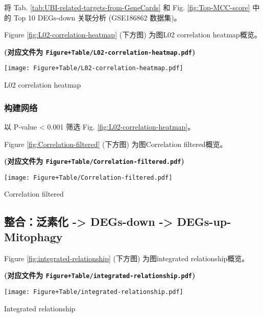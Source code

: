 \documentclass[
]{article}
\begin{document}
将 Tab. \ref{tab:UBI-related-targets-from-GeneCards} 和 Fig. \ref{fig:Top-MCC-score} 中的 Top 10 DEGs-down
关联分析 (GSE186862 数据集)。

Figure \ref{fig:L02-correlation-heatmap} (下方图) 为图L02 correlation heatmap概览。

\textbf{(对应文件为 \texttt{Figure+Table/L02-correlation-heatmap.pdf})}

\def\@captype{figure}
\begin{center}
\texttt{[image: Figure+Table/L02-correlation-heatmap.pdf]}
\caption{L02 correlation heatmap}\label{fig:L02-correlation-heatmap}
\end{center}

\hypertarget{ux6784ux5efaux7f51ux7edc}{%
\subsubsection{构建网络}\label{ux6784ux5efaux7f51ux7edc}}

以 P-value \textless{} 0.001 筛选 Fig. \ref{fig:L02-correlation-heatmap}。

Figure \ref{fig:Correlation-filtered} (下方图) 为图Correlation filtered概览。

\textbf{(对应文件为 \texttt{Figure+Table/Correlation-filtered.pdf})}

\def\@captype{figure}
\begin{center}
\texttt{[image: Figure+Table/Correlation-filtered.pdf]}
\caption{Correlation filtered}\label{fig:Correlation-filtered}
\end{center}

\hypertarget{ux6574ux5408ux6cdbux7d20ux5316---degs-down---degs-up-mitophagy}{%
\subsection{整合：泛素化 -\textgreater{} DEGs-down -\textgreater{} DEGs-up-Mitophagy}\label{ux6574ux5408ux6cdbux7d20ux5316---degs-down---degs-up-mitophagy}}

Figure \ref{fig:integrated-relationship} (下方图) 为图integrated relationship概览。

\textbf{(对应文件为 \texttt{Figure+Table/integrated-relationship.pdf})}

\def\@captype{figure}
\begin{center}
\texttt{[image: Figure+Table/integrated-relationship.pdf]}
\caption{Integrated relationship}\label{fig:integrated-relationship}
\end{center}
\end{document}

